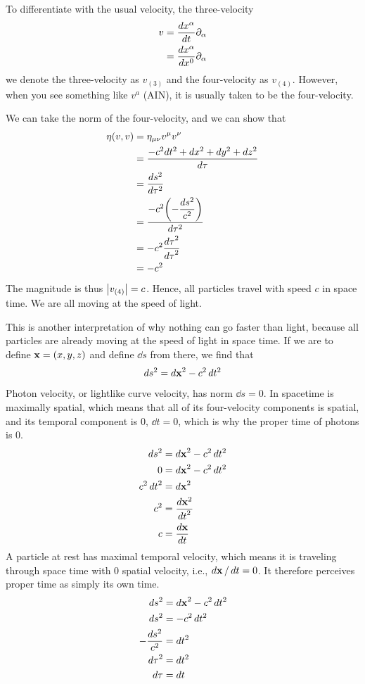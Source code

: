 		To differentiate with the usual velocity, the three-velocity
		\begin{align*}
		    v &= 
			\dv{x^\alpha}{t}\partial_\alpha\\
			 &=
			\dv{x^\alpha}{x^0}\partial_\alpha
		\end{align*}
		we denote the three-velocity as $v_{(3)}$ and the four-velocity
		as $v_{(4)}$. However, when you see something like $v^a$ (AIN), it is
		usually taken to be the four-velocity. 

		We can take the norm of the four-velocity, and we can show that
		\begin{align*}
			\eta(v, v)
			&=
			\eta_{\mu\nu} v^\mu v^\nu \\
			&= 
			\frac{-c^2 dt^2 + dx^2 + dy^2 + dz^2}{d\tau} \\
			&=
			\frac{ds^2}{d\tau^2} \\
			&=
			\frac{-c^2 \qty(-\dfrac{ds^2}{c^2})}{d\tau^2} \\
			&= -c^2 \frac{\dd{\tau}^2}{\dd{\tau}^2} \\ 
			&= -c^2
		\end{align*}
		The magnitude is thus $\abs{v_{(4)}}= c$. Hence, all particles travel with speed $c$ in space time. 
		We are all moving at the speed of light.

		This is another interpretation of why nothing can go faster than
		light, because all particles are already moving at the speed of light
		in space time. If we are to define $\vb{x} = (x,y,z)$ and define $\dd{s}$ from there,
		we find that
		\[
			ds^2 = \dd{\vb{x}}^2 - c^2\dd{t^2}
		\]
		Photon velocity, or lightlike curve velocity, has norm $\dd{s} = 0$. In spacetime is maximally spatial, which means that
		all of its four-velocity components is spatial, and its temporal component
		is 0, $\dd{t}=0$, which is why the proper time of photons is 0. 
		\begin{align*}
			ds^2 &= \dd{\vb{x}}^2 - c^2\dd{t^2}\\
			0 &= \dd{\vb{x}}^2 - c^2\dd{t^2}\\
			c^2 \dd{t}^2 &= \dd{\vb{x}}^2\\
			c^2 &= \frac{\dd{\vb{x}^2}}{\dd{t}^2} \\
			c &= \dv{\vb{x}}{t} 
		\end{align*}
		A particle at rest 
		has maximal temporal velocity, which means it is traveling through
		space time with 0 spatial velocity, i.e., $\dd{\vb{x}}/\dd{t}=0$. It therefore perceives proper time
		as simply its own time. 
		\begin{align*}
			ds^2 &= \dd{\vb{x}}^2 - c^2\dd{t^2}\\
			ds^2 &= -c^2\dd{t^2}\\
			-\frac{ds^2}{c^2} &= \dd{t^2}\\
			\dd{\tau}^2 &= \dd{t^2}\\
			\dd{\tau} &= \dd{t}
		\end{align*}

